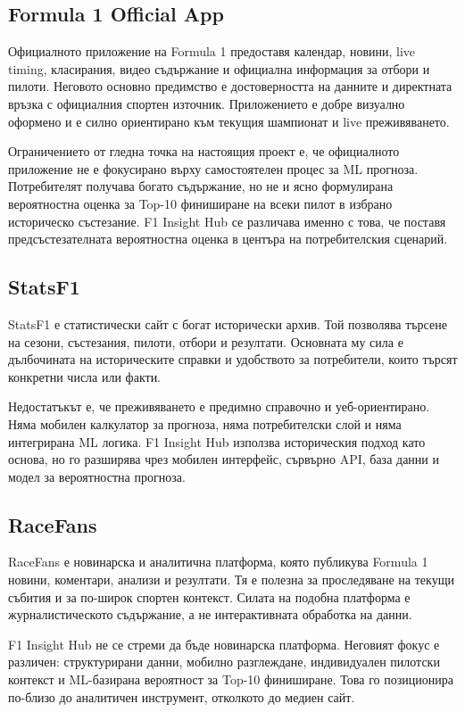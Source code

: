 \documentclass[12pt,a4paper]{article}
\begin{document}
\subsection{Formula 1 Official App}

Официалното приложение на Formula 1 предоставя календар, новини, live timing, класирания, видео съдържание и официална информация за отбори и пилоти. Неговото основно предимство е достоверността на данните и директната връзка с официалния спортен източник. Приложението е добре визуално оформено и е силно ориентирано към текущия шампионат и live преживяването.

Ограничението от гледна точка на настоящия проект е, че официалното приложение не е фокусирано върху самостоятелен процес за ML прогноза. Потребителят получава богато съдържание, но не и ясно формулирана вероятностна оценка за Top-10 финиширане на всеки пилот в избрано историческо състезание. F1 Insight Hub се различава именно с това, че поставя предсъстезателната вероятностна оценка в центъра на потребителския сценарий.

\subsection{StatsF1}

StatsF1 е статистически сайт с богат исторически архив. Той позволява търсене на сезони, състезания, пилоти, отбори и резултати. Основната му сила е дълбочината на историческите справки и удобството за потребители, които търсят конкретни числа или факти.

Недостатъкът е, че преживяването е предимно справочно и уеб-ориентирано. Няма мобилен калкулатор за прогноза, няма потребителски слой и няма интегрирана ML логика. F1 Insight Hub използва историческия подход като основа, но го разширява чрез мобилен интерфейс, сървърно API, база данни и модел за вероятностна прогноза.

\subsection{RaceFans}

RaceFans е новинарска и аналитична платформа, която публикува Formula 1 новини, коментари, анализи и резултати. Тя е полезна за проследяване на текущи събития и за по-широк спортен контекст. Силата на подобна платформа е журналистическото съдържание, а не интерактивната обработка на данни.

F1 Insight Hub не се стреми да бъде новинарска платформа. Неговият фокус е различен: структурирани данни, мобилно разглеждане, индивидуален пилотски контекст и ML-базирана вероятност за Top-10 финиширане. Това го позиционира по-близо до аналитичен инструмент, отколкото до медиен сайт.
\end{document}
